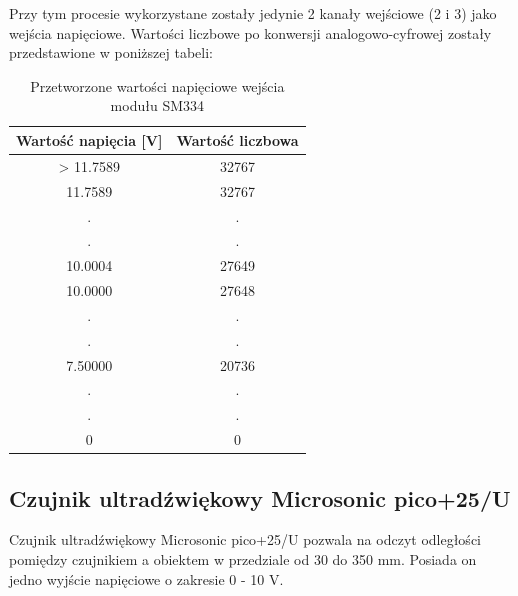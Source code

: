 Przy tym procesie wykorzystane zostały jedynie 2 kanały wejściowe (2 i 3) jako wejścia napięciowe. Wartości liczbowe po konwersji analogowo-cyfrowej zostały przedstawione w poniższej tabeli:
\begin{table}[h]
\centering
 \begin{tabular}{||c | c ||} 
 \hline
 Wartość napięcia [V] & Wartość liczbowa  \\ [0.5ex] 
 \hline\hline
 > 11.7589 & 32767  \\ 
 \hline
 11.7589 & 32767 \\
 . & . \\
 . & . \\
 10.0004 & 27649\\
 \hline
 10.0000 & 27648\\
 . & . \\
 . & . \\
 7.50000 & 20736\\
 . & . \\
 . & . \\
 0 & 0 \\
 \hline
\end{tabular}
\caption{Przetworzone wartości napięciowe wejścia modułu SM334}
\label{tab:2_wartoscio_napiecia}
\end{table}

\subsection{Czujnik ultradźwiękowy Microsonic pico+25/U}
Czujnik ultradźwiękowy Microsonic pico+25/U pozwala na odczyt odległości pomiędzy czujnikiem a obiektem w przedziale od 30 do 350 mm. Posiada on jedno wyjście napięciowe o zakresie 0 - 10 V. 
